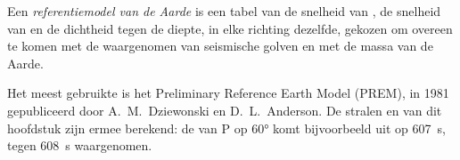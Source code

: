 \begin{definition}\label{def:g11:seismic-structure:reference-model}
Een \emph{referentiemodel van de Aarde} is
een tabel van de snelheid van , de snelheid van  en de dichtheid
tegen de diepte, in elke richting dezelfde, gekozen om overeen te komen met de
waargenomen  van seismische golven en met de massa van de Aarde.
\end{definition}

Het meest gebruikte is het Preliminary Reference Earth Model (PREM), in 1981
gepubliceerd door A.~M.~Dziewonski en D.~L.~Anderson. De stralen en 
van dit hoofdstuk zijn ermee berekend: de  van P op \ang{60} komt
bijvoorbeeld uit op \qty{607}{s}, tegen \qty{608}{s} waargenomen.

